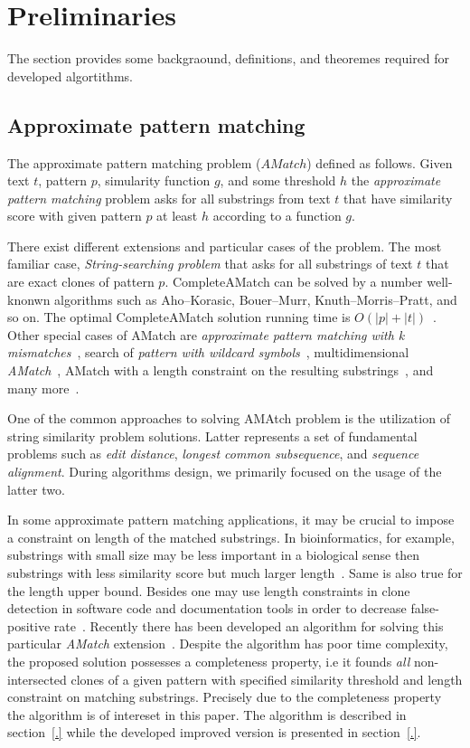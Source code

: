 \section{Preliminaries}
\label{section:preliminaries}

The section provides some backgraound, definitions, and theoremes required for
developed algortithms.

\subsection{Approximate pattern matching}
The approximate pattern matching problem ($AMatch$) defined as follows.
Given text $t$, pattern $p$, simularity function $g$, and some threshold $h$ the \emph{approximate pattern matching} problem asks for all substrings from text $t$ that have similarity score  with given pattern $p$ at least $h$ according to a function $g$.  

There exist different extensions and particular cases of the problem.
The most familiar case, \emph{String-searching problem} that asks for all substrings of text $t$ that are exact clones of pattern $p$.
CompleteAMatch can be solved by a number well-knonwn algorithms such as Aho--Korasic, Bouer--Murr, Knuth--Morris--Pratt, and so on.
The optimal CompleteAMatch solution running time is $O(|p|+|t|)$~\cite{.}.
Other special cases of AMatch are \emph{approximate pattern matching with k mismatches}~\cite{.}, search of \emph{pattern with wildcard symbols}~\cite{.}, multidimensional \emph{AMatch}~\cite{.}, AMatch with a length constraint on the resulting substrings~\cite{.}, and many more~\cite{.}.

One of the common approaches to solving AMAtch problem is the utilization of string similarity problem solutions.
Latter represents a set of fundamental problems such as \emph{edit distance}, \emph{longest common subsequence}, and \emph{sequence alignment}.
During algorithms design, we primarily focused on the usage of the latter two.

In some approximate pattern matching applications, it may be crucial to impose a constraint on length of the matched substrings.
In bioinformatics, for example, substrings with small size may be less important in a biological sense then substrings with less similarity score but much larger length~\cite{.}.
Same is also true for the length upper bound.
Besides one may use length constraints in clone detection in software code and documentation tools in order to decrease false-positive rate~\cite{.}.
Recently there has been developed an algorithm for solving this particular \emph{AMatch} extension~\cite{.}.
Despite the algorithm has poor time complexity, the proposed solution possesses a completeness property, i.e it founds \emph{all} non-intersected clones of a given pattern with specified similarity threshold and length constraint on matching substrings.
Precisely due to the completeness property the algorithm is of intereset in this paper.
The algorithm is described in section~\ref{.} while the developed improved version is presented in section~\ref{.}.

